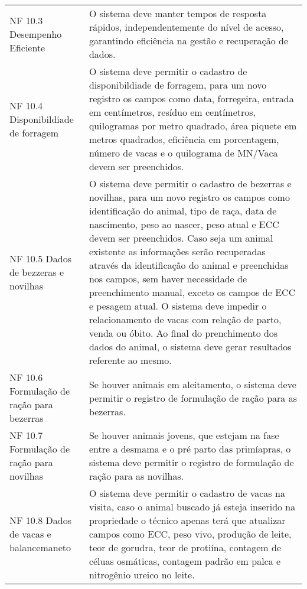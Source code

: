 \begin{tabframed}[htb]
\begin{tabular}{|l|l|}
    \multicolumn{1}{|p{3cm}|}{\raggedright NF 10.3 Desempenho Eficiente}              &
    \multicolumn{1}{|p{12cm}|}{\raggedright O sistema deve manter tempos de resposta rápidos, independentemente do nível de acesso, garantindo eficiência na gestão e recuperação de dados.}
    \\ \cline{1-2}

    \multicolumn{1}{|p{3cm}|}{\raggedright NF 10.4 Disponibildiade de forragem}       &
    \multicolumn{1}{|p{12cm}|}{\raggedright O sistema deve permitir o cadastro de disponibildiade de forragem, para um novo registro os campos como data, forregeira, entrada em centímetros, resíduo em centímetros, quilogramas por metro quadrado, área piquete em metros quadrados, eficiência em porcentagem, número de vacas e o quilograma de MN/Vaca devem ser preenchidos.}
    \\ \cline{1-2}

    \multicolumn{1}{|p{3cm}|}{\raggedright NF 10.5  Dados de bezzeras e novilhas}
    &
    \multicolumn{1}{|p{12cm}|}{\raggedright O sistema deve permitir o cadastro de bezerras e novilhas, para um novo registro os campos como identificação do animal, tipo de raça, data de nascimento, peso ao nascer, peso atual e \gls{ECC} devem ser preenchidos. Caso seja um animal existente as informações serão recuperadas através da identificação do animal e preenchidas nos campos, sem haver necessidade de preenchimento manual, exceto os campos de \gls{ECC} e pesagem atual. O sistema deve impedir o relacionamento de vacas com relação de parto, venda ou óbito. Ao final do prenchimento dos dados do animal, o sistema deve gerar resultados referente ao mesmo.}
    \\ \cline{1-2}

    \multicolumn{1}{|p{3.2cm}|}{\raggedright NF 10.6 Formulação de ração para bezerras} &
    \multicolumn{1}{|p{12cm}|}{\raggedright Se houver animais em aleitamento, o sistema deve permitir o registro de formulação de ração para as bezerras.}
    \\ \cline{1-2}

    \multicolumn{1}{|p{3cm}|}{\raggedright NF 10.7 Formulação de ração para novilhas} &
    \multicolumn{1}{|p{12cm}|}{\raggedright Se houver animais jovens, que estejam na fase entre a desmama e o pré parto das primíapras, o sistema deve permitir o registro de formulação de ração para as novilhas.}
    \\ \cline{1-2}

    \multicolumn{1}{|p{3cm}|}{\raggedright NF 10.8 Dados de vacas e balancemaneto}    &
    \multicolumn{1}{|p{12cm}|}{\raggedright O sistema deve permitir o cadastro de vacas na visita, caso o animal buscado já esteja inserido na propriedade o técnico apenas terá que atualizar campos como \gls{ECC}, peso vivo, produção de leite, teor de gorudra, teor de protiína, contagem de céluas osmáticas, contagem padrão em palca e nitrogênio ureico no leite.}
    \\ \cline{1-2}


\end{tabular}
\end{tabframed}
